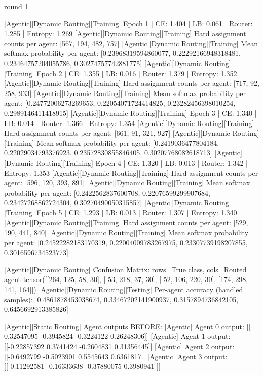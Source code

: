 round 1

[Agentic][Dynamic Routing][Training] Epoch 1 | CE: 1.404 | LB: 0.061 | Router: 1.285 | Entropy: 1.269
[Agentic][Dynamic Routing][Training] Hard assignment counts per agent: [567, 194, 482, 757]
[Agentic][Dynamic Routing][Training] Mean softmax probability per agent: [0.23968319594860077, 0.22292166948318481, 0.23464757204055786, 0.30274757742881775]
[Agentic][Dynamic Routing][Training] Epoch 2 | CE: 1.355 | LB: 0.016 | Router: 1.379 | Entropy: 1.352
[Agentic][Dynamic Routing][Training] Hard assignment counts per agent: [717, 92, 258, 933]
[Agentic][Dynamic Routing][Training] Mean softmax probability per agent: [0.24772006273269653, 0.22054071724414825, 0.23282456398010254, 0.2989146411418915]
[Agentic][Dynamic Routing][Training] Epoch 3 | CE: 1.340 | LB: 0.014 | Router: 1.366 | Entropy: 1.354
[Agentic][Dynamic Routing][Training] Hard assignment counts per agent: [661, 91, 321, 927]
[Agentic][Dynamic Routing][Training] Mean softmax probability per agent: [0.2419036477804184, 0.22029034793376923, 0.23572830855846405, 0.30207768082618713]
[Agentic][Dynamic Routing][Training] Epoch 4 | CE: 1.320 | LB: 0.013 | Router: 1.342 | Entropy: 1.353
[Agentic][Dynamic Routing][Training] Hard assignment counts per agent: [596, 120, 393, 891]
[Agentic][Dynamic Routing][Training] Mean softmax probability per agent: [0.2422562837600708, 0.22076599299907684, 0.23427268862724304, 0.30270490050315857]
[Agentic][Dynamic Routing][Training] Epoch 5 | CE: 1.293 | LB: 0.013 | Router: 1.307 | Entropy: 1.340
[Agentic][Dynamic Routing][Training] Hard assignment counts per agent: [529, 190, 441, 840]
[Agentic][Dynamic Routing][Training] Mean softmax probability per agent: [0.24522282183170319, 0.22004009783267975, 0.23307739198207855, 0.3016596734523773]

[Agentic][Dynamic Routing] Confusion Matrix: rows=True class, cols=Routed agent
tensor([[264, 125,  58,  30],
[ 53, 218,  37,  30],
[ 52, 106, 220,  30],
[174, 298, 141, 164]])
[Agentic][Dynamic Routing][Testing] Per-agent accuracy (handled samples): [0.4861878453038674, 0.33467202141900937, 0.3157894736842105, 0.6456692913385826]

[Agentic][Static Routing] Agent outputs BEFORE:
[Agentic] Agent 0 output: [[ 0.32547095 -0.3945824  -0.3224122   0.26248306]]
[Agentic] Agent 1 output: [[-0.22857392  0.3741424  -0.2604831   0.31356445]]
[Agentic] Agent 2 output: [[-0.6492799 -0.5023901  0.5545643  0.6361817]]
[Agentic] Agent 3 output: [[-0.11292581 -0.16333638 -0.37880075  0.3980941 ]]

